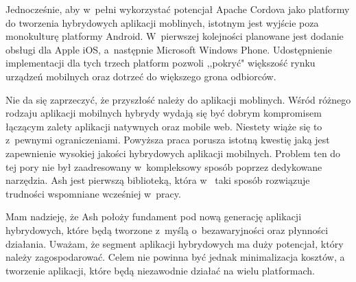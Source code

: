 \documentclass[brudnopis]{xmgr}
\begin{document}
Jednocześnie, aby w~pełni wykorzystać potencjał Apache Cordova jako platformy do tworzenia hybrydowych aplikacji moblinych, istotnym jest wyjście poza monokulturę platformy Android. W~pierwszej kolejności planowane jest dodanie obsługi dla Apple iOS, a~następnie Microsoft Windows Phone.  Udostępnienie implementacji dla tych trzech platform pozwoli ,,pokryć" większość rynku urządzeń mobilnych oraz dotrzeć do większego grona odbiorców. 

\summary

Nie da się zaprzeczyć, że przyszłość należy do aplikacji moblinych. Wśród różnego rodzaju aplikacji mobilnych hybrydy wydają się być dobrym kompromisem łączącym zalety aplikacji natywnych oraz mobile web. Niestety wiąże się to z~pewnymi ograniczeniami. Powyższa praca porusza istotną kwestię jaką jest zapewnienie wysokiej jakości hybrydowych aplikacji mobilnych. Problem ten do tej pory nie był zaadresowany w~kompleksowy sposób poprzez dedykowane narzędzia. Ash jest pierwszą biblioteką, która w~ taki sposób rozwiązuje trudności wspomniane wcześniej w~pracy.

Mam nadzieję, że Ash położy fundament pod nową generację aplikacji hybrydowych, które będą tworzone z~myślą o~bezawaryjności oraz płynności działania. Uważam, że segment aplikacji hybrydowych ma duży potencjał, który należy zagospodarować.  Celem nie powinna być jednak minimalizacja kosztów, a tworzenie aplikacji, które będą niezawodnie działać na wielu platformach.

\nocite{*}

\appendix






\oswiadczenie
\end{document}
